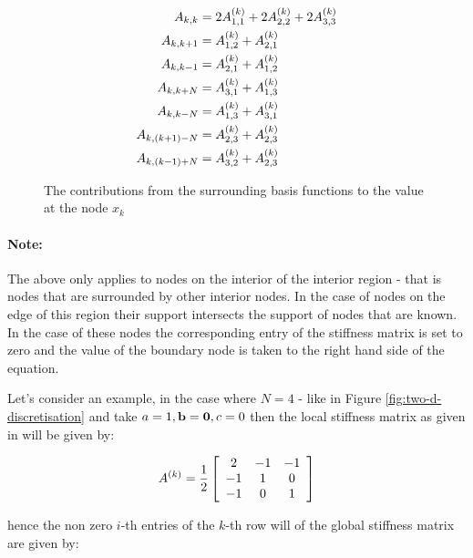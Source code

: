 \begin{align}
  \begin{split}
    A_{k,k} &= 2A^{(k)}_{1,1} + 2A^{(k)}_{2,2} + 2A^{(k)}_{3,3} \\
    A_{k,k+1} &= A^{(k)}_{1,2} + A^{(k)}_{2,1} \\
    A_{k,k-1} &= A^{(k)}_{2,1} + A^{(k)}_{1,2} \\
    A_{k,k+N} &= A^{(k)}_{3,1} + A^{(k)}_{1,3} \\
    A_{k,k-N} &= A^{(k)}_{1,3} + A^{(k)}_{3,1} \\
    A_{k,(k+1)-N} &= A^{(k)}_{2,3} + A^{(k)}_{2,3} \\
    A_{k,(k-1)+N} &= A^{(k)}_{3,2} + A^{(k)}_{2,3}
  \end{split}
\end{align}

\begin{figure}
    \centering
    
    \caption{The contributions from the surrounding basis functions to the
        value at the node $x_k$}
    \label{fig:twod-global-basis-contrib}
\end{figure}

\paragraph{Note:}

The above only applies to nodes on the interior of the interior region - that
is nodes that are surrounded by other interior nodes. In the case of nodes on
the edge of this region their support intersects the support of nodes that are
known. In the case of these nodes the corresponding entry of the stiffness
matrix is set to zero and the value of the boundary node is taken to the right
hand side of the equation.

Let's consider an example, in the case where $N = 4$ - like in Figure
\ref{fig:two-d-discretisation} and take $a = 1, \mathbf{b} = \mathbf{0}, c = 0$
then the local stiffness matrix as given in
 will be given by:

\begin{equation}
    A^{(k)} = \frac{1}{2}\left[\begin{array}{c c c}
            2 & -1 & -1 \\ -1 & 1 & 0 \\ -1 & 0 & 1
    \end{array}\right]
\end{equation}

hence the non zero $i$-th entries of the $k$-th row will of the global
stiffness matrix are given by:


